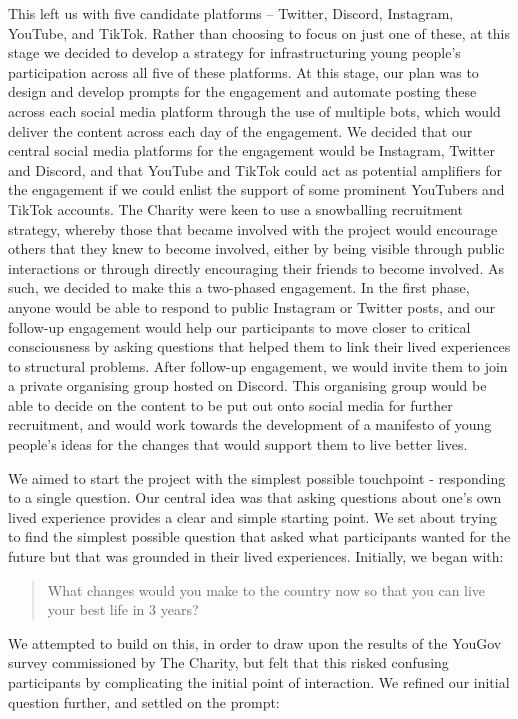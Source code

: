 This left us with five candidate platforms – Twitter, Discord, Instagram, YouTube, and TikTok. Rather than choosing to focus on just one of these, at this stage we decided to develop a strategy for infrastructuring young people's participation across all five of these platforms. At this stage, our plan was to design and develop prompts for the engagement and automate posting these across each social media platform through the use of multiple bots, which would deliver the content across each day of the engagement. We decided  that our central social media platforms for the engagement would be Instagram, Twitter and Discord, and that YouTube and TikTok could act as potential amplifiers for the engagement if we could enlist the support of some prominent YouTubers and TikTok accounts. The Charity were keen to use a snowballing recruitment strategy, whereby those that became involved with the project would encourage others that they knew to become involved, either by being visible through public interactions or through directly encouraging their friends to become involved. As such, we decided to make this a two-phased engagement. In the first phase, anyone would be able to respond to public Instagram or Twitter posts, and our follow-up engagement would help our participants to move closer to critical consciousness by asking questions that helped them to link their lived experiences to structural problems. After follow-up engagement, we would invite them to join a private organising group hosted on Discord. This organising group would be able to decide on the content to be put out onto social media for further recruitment, and would work towards the development of a manifesto of young people's ideas for the changes that would support them to live better lives. 

We aimed to start the project with the simplest possible touchpoint - responding to a single question. Our central idea was that asking questions about one’s own lived experience provides a clear and simple starting point. We set about trying to find the simplest possible question that asked what participants wanted for the future but that was grounded in their lived experiences. Initially, we began with:

\blockquote{What changes would you make to the country now so that you can live your best life in 3 years?}

We attempted to build on this, in order to draw upon the results of the YouGov survey commissioned by The Charity, but felt that this risked confusing participants by complicating the initial point of interaction. We refined our initial question further, and settled on the prompt:

